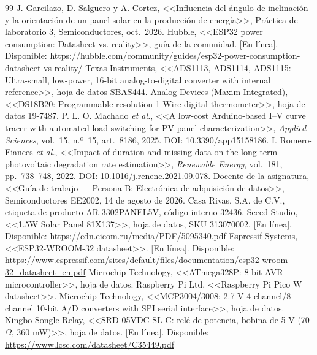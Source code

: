 \documentclass[10pt,letterpaper,twocolumn]{article}
\begin{document}
\begin{thebibliography}{99}
 J. Garcilazo, D. Salguero y A. Cortez, <<Influencia del ángulo de inclinación y la orientación de un panel solar en la producción de energía>>, Práctica de laboratorio 3, Semiconductores, oct.~2026.
 Hubble, <<ESP32 power consumption: Datasheet vs. reality>>, guía de la comunidad. [En línea]. Disponible: https://hubble.com/community/guides/esp32-power-consumption-datasheet-vs-reality/
 Texas Instruments, <<ADS1113, ADS1114, ADS1115: Ultra-small, low-power, 16-bit analog-to-digital converter with internal reference>>, hoja de datos SBAS444.
 Analog Devices (Maxim Integrated), <<DS18B20: Programmable resolution 1-Wire digital thermometer>>, hoja de datos 19-7487.
 P. L. O. Machado \emph{et al.}, <<A low-cost Arduino-based I--V curve tracer with automated load switching for PV panel characterization>>, \emph{Applied Sciences}, vol.~15, n.º~15, art.~8186, 2025. DOI: 10.3390/app15158186.
 I. Romero-Fiances \emph{et al.}, <<Impact of duration and missing data on the long-term photovoltaic degradation rate estimation>>, \emph{Renewable Energy}, vol.~181, pp.~738--748, 2022. DOI: 10.1016/j.renene.2021.09.078.
 Docente de la asignatura, <<Guía de trabajo --- Persona B: Electrónica de adquisición de datos>>, Semiconductores EE2002, 14 de agosto de 2026.
 Casa Rivas, S.A. de C.V., etiqueta de producto AR-3302PANEL5V, código interno 32436.
 Seeed Studio, <<1.5W Solar Panel 81X137>>, hoja de datos, SKU 313070002. [En línea]. Disponible: https://cdn.eicom.ru/media/PDF/5095340.pdf
 Espressif Systems, <<ESP32-WROOM-32 datasheet>>. [En línea]. Disponible: \url{https://www.espressif.com/sites/default/files/documentation/esp32-wroom-32\_datasheet\_en.pdf}
 Microchip Technology, <<ATmega328P: 8-bit AVR microcontroller>>, hoja de datos.
 Raspberry Pi Ltd, <<Raspberry Pi Pico W datasheet>>.
 Microchip Technology, <<MCP3004/3008: 2.7 V 4-channel/8-channel 10-bit A/D converters with SPI serial interface>>, hoja de datos.
 Ningbo Songle Relay, <<SRD-05VDC-SL-C: relé de potencia, bobina de 5 V (70 $\Omega$, 360 mW)>>, hoja de datos. [En línea]. Disponible: \url{https://www.lcsc.com/datasheet/C35449.pdf}
\end{thebibliography}


\clearpage
\onecolumn
{}

\end{document}
